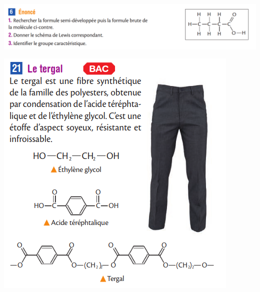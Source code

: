 \documentclass[10pt]{article}
\begin{document}
\begin{center}
\begin{minipage}[c]{0.45\textwidth}
	\end{minipage}

	\includegraphics[scale=0.4]{assets/6.png}

	\vspace{20pt}

	\begin{minipage}[c]{0.45\textwidth}
		\centering
		\includegraphics[scale=0.6]{assets/bacpart1.png}
	\end{minipage}
	\hspace{0.05\textwidth}
	\begin{minipage}[c]{0.45\textwidth}
		\centering

\end{minipage}
\end{center}
\end{document}
